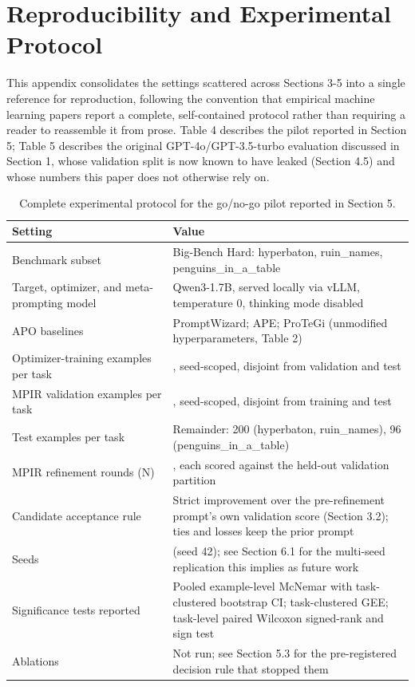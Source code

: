 \documentclass[a4paper,fleqn]{cas-sc}
\begin{document}
\section{Reproducibility and Experimental Protocol}

This appendix consolidates the settings scattered across Sections 3-5 into a single reference for reproduction, following the convention that empirical machine learning papers report a complete, self-contained protocol rather than requiring a reader to reassemble it from prose. Table 4 describes the pilot reported in Section 5; Table 5 describes the original GPT-4o/GPT-3.5-turbo evaluation discussed in Section 1, whose validation split is now known to have leaked (Section 4.5) and whose numbers this paper does not otherwise rely on.

\begin{table}[htbp]
\centering
\small
\caption{Complete experimental protocol for the go/no-go pilot reported in Section 5.}
\begin{tabular}{>{\raggedright\arraybackslash}p{0.4\linewidth}>{\raggedright\arraybackslash}p{0.6\linewidth}}
\toprule
\textbf{Setting} & \textbf{Value} \\
\midrule
Benchmark subset & Big-Bench Hard: hyperbaton, ruin\_\allowbreak{}names, penguins\_\allowbreak{}in\_\allowbreak{}a\_\allowbreak{}table \\
Target, optimizer, and meta-prompting model & Qwen3-1.7B, served locally via vLLM, temperature 0, thinking mode disabled \\
APO baselines & PromptWizard; APE; ProTeGi (unmodified hyperparameters, Table 2) \\
Optimizer-training examples per task & 25, seed-scoped, disjoint from validation and test \\
MPIR validation examples per task & 25, seed-scoped, disjoint from training and test \\
Test examples per task & Remainder: 200 (hyperbaton, ruin\_\allowbreak{}names), 96 (penguins\_\allowbreak{}in\_\allowbreak{}a\_\allowbreak{}table) \\
MPIR refinement rounds (N) & 7, each scored against the held-out validation partition \\
Candidate acceptance rule & Strict improvement over the pre-refinement prompt's own validation score (Section 3.2); ties and losses keep the prior prompt \\
Seeds & 1 (seed 42); see Section 6.1 for the multi-seed replication this implies as future work \\
Significance tests reported & Pooled example-level McNemar with task-clustered bootstrap CI; task-clustered GEE; task-level paired Wilcoxon signed-rank and sign test \\
Ablations & Not run; see Section 5.3 for the pre-registered decision rule that stopped them \\
\bottomrule
\end{tabular}
\end{table}
\end{document}
